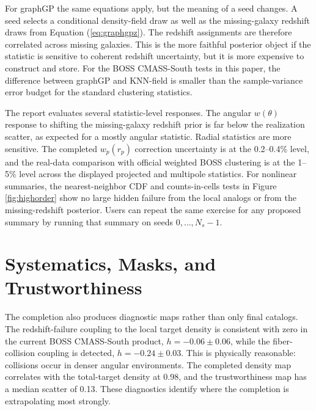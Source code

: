\documentclass[apj]{emulateapj}
\begin{document}
For graphGP the same equations apply, but the meaning of a seed changes.  A
seed selects a conditional density-field draw as well as the missing-galaxy
redshift draws from Equation (\ref{eq:graphgpz}).  The redshift assignments are
therefore correlated across missing galaxies.  This is the more faithful
posterior object if the statistic is sensitive to coherent redshift
uncertainty, but it is more expensive to construct and store.  For the BOSS
CMASS-South tests in this paper, the difference between graphGP and KNN-field
is smaller than the sample-variance error budget for the standard clustering
statistics.

The report evaluates several statistic-level responses.  The angular
$w(\theta)$ response to shifting the missing-galaxy redshift prior is far below
the realization scatter, as expected for a mostly angular statistic.  Radial
statistics are more sensitive.  The completed $w_p(r_p)$ correction uncertainty
is at the 0.2--0.4\% level, and the real-data comparison with official
weighted BOSS clustering is at the 1--5\% level across the displayed projected
and multipole statistics.  For nonlinear summaries, the nearest-neighbor CDF
and counts-in-cells tests in Figure \ref{fig:highorder} show no large hidden
failure from the local analogs or from the missing-redshift posterior.  Users
can repeat the same exercise for any proposed summary by running that summary
on seeds $0,\ldots,N_s-1$.

\section{Systematics, Masks, and Trustworthiness}
\label{sec:systematics}

The completion also produces diagnostic maps rather than only final catalogs.
The redshift-failure coupling to the local target density is consistent with
zero in the current BOSS CMASS-South product, $h=-0.06\pm0.06$, while the
fiber-collision coupling is detected, $h=-0.24\pm0.03$.  This is physically
reasonable: collisions occur in denser angular environments.  The completed
density map correlates with the total-target density at 0.98, and the
trustworthiness map has a median scatter of 0.13.  These diagnostics identify
where the completion is extrapolating most strongly.
\end{document}

